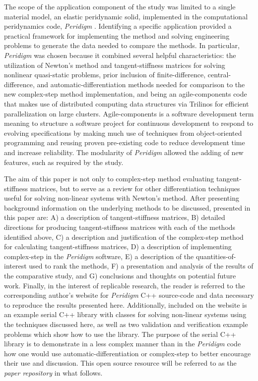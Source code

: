 \documentclass[preprint,12pt]{elsarticle}
\begin{document}
The scope of the application component of the study was limited to a single
material model, an elastic peridynamic solid, implemented in the computational
peridynamics code, \textit{Peridigm} \cite{peridigm}. Identifying a specific
application provided a practical framework for implementing the
 method and solving engineering
problems to generate the data needed to compare the methods. In particular,
\emph{Peridigm} was chosen because it combined several helpful
characteristics: the utilization of Newton's method and tangent-stiffness
matrices for solving nonlinear quasi-static problems, prior inclusion of
finite-difference, central-difference, and automatic-differentiation
methods needed for comparison to the new complex-step method
implementation, and being an agile-components code that makes use of
distributed computing data structures via Trilinos \cite{trilinos} for
efficient parallelization on large clusters. Agile-components is a software
development term meaning to structure a software project for continuous
development to respond to evolving specifications by making much use of
techniques from object-oriented programming and reusing proven pre-existing
code to reduce development time and increase reliability. The modularity of
\emph{Peridigm} allowed the adding of new features, such as required by the
study.

The aim of this paper is not only to  complex-step method  evaluating tangent-stiffness matrices, but to serve as a review
for other differentiation techniques useful for solving non-linear systems with
Newton's method. After presenting background information on the underlying
methods to be discussed, presented in this paper are: A) a description of
tangent-stiffness matrices, B) detailed directions for producing
tangent-stiffness matrices with each of the methods identified above, C) a
description and justification of the complex-step method for calculating
tangent-stiffness matrices, D) a description of implementing complex-step in
the \emph{Peridigm} software, E) a description of the quantities-of-interest
used to rank the methods, F) a presentation and analysis of the results of the
comparative study, and G) conclusions and thoughts on potential future work.
Finally, in the interest of replicable research, the reader is referred to the
corresponding author's website for \emph{Peridigm} C++ source-code and data
necessary to reproduce the results presented here. Additionally, included on
the website is an example serial C++ library with classes for solving
non-linear systems using the techniques discussed here, as well as two
validation and verification example problems which show how to use the library.
The purpose of the serial C++ library is to demonstrate in a less complex
manner than in the \emph{Peridigm} code how one would use
automatic-differentiation or complex-step to better encourage their use and
discussion. This open source resource will be referred to as the \emph{paper
repository} in what follows.
\end{document}
